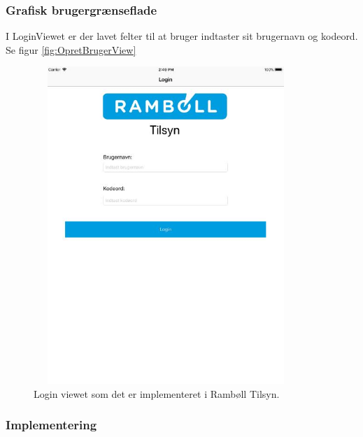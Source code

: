 \subsubsection{Grafisk brugergrænseflade}
I LoginViewet er der lavet felter til at bruger indtaster sit brugernavn og kodeord. Se figur \ref{fig:OpretBrugerView}
\begin{figure}[H] %
	\centering
	\includegraphics[height=12cm, width=10cm]{../ArkitekturDesign/Design/Login/LoginView}
	\caption{Login viewet som det er implementeret i Rambøll Tilsyn.}
	\label{fig:LoginView}
\end{figure}

\subsubsection{Implementering}

\clearpage